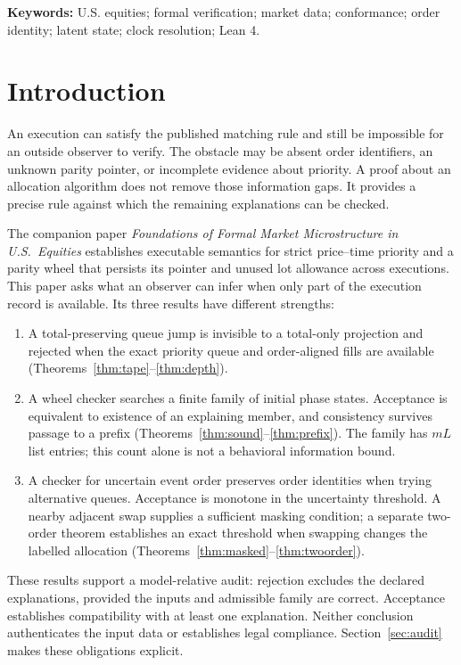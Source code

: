 \documentclass[11pt]{article}
\theoremstyle{definition}
\theoremstyle{remark}
\begin{document}
\noindent\textbf{Keywords:} U.S. equities; formal verification; market data; conformance; order identity; latent state; clock resolution; Lean 4.
\clearpage
\tableofcontents
\clearpage

\section{Introduction}

An execution can satisfy the published matching rule and still be impossible for an outside observer to verify. The obstacle may be absent order identifiers, an unknown parity pointer, or incomplete evidence about priority. A proof about an allocation algorithm does not remove those information gaps. It provides a precise rule against which the remaining explanations can be checked.

The companion paper \emph{Foundations of Formal Market Microstructure in U.S.\ Equities} \citep{noguer2026foundations} establishes executable semantics for strict price--time priority and a parity wheel that persists its pointer and unused lot allowance across executions. This paper asks what an observer can infer when only part of the execution record is available. Its three results have different strengths:
\begin{enumerate}[leftmargin=2em]
\item A total-preserving queue jump is invisible to a total-only projection and rejected when the exact priority queue and order-aligned fills are available (Theorems~\ref{thm:tape}--\ref{thm:depth}).
\item A wheel checker searches a finite family of initial phase states. Acceptance is equivalent to existence of an explaining member, and consistency survives passage to a prefix (Theorems~\ref{thm:sound}--\ref{thm:prefix}). The family has $mL$ list entries; this count alone is not a behavioral information bound.
\item A checker for uncertain event order preserves order identities when trying alternative queues. Acceptance is monotone in the uncertainty threshold. A nearby adjacent swap supplies a sufficient masking condition; a separate two-order theorem establishes an exact threshold when swapping changes the labelled allocation (Theorems~\ref{thm:masked}--\ref{thm:twoorder}).
\end{enumerate}

These results support a model-relative audit: rejection excludes the declared explanations, provided the inputs and admissible family are correct. Acceptance establishes compatibility with at least one explanation. Neither conclusion authenticates the input data or establishes legal compliance. Section~\ref{sec:audit} makes these obligations explicit.
\end{document}
